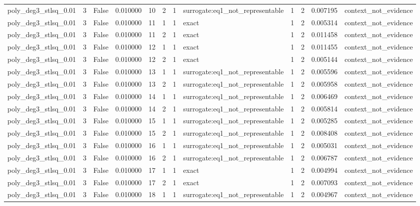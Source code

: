 \begin{tabular}{lrrrrrrlrrrl}
poly\_deg3\_stlsq\_0.01 & 3 & False & 0.010000 & 10 & 2 & 1 & surrogate:eq1\_not\_representable & 1 & 2 & 0.007195 & context\_not\_evidence \\
poly\_deg3\_stlsq\_0.01 & 3 & False & 0.010000 & 11 & 1 & 1 & exact & 1 & 2 & 0.005314 & context\_not\_evidence \\
poly\_deg3\_stlsq\_0.01 & 3 & False & 0.010000 & 11 & 2 & 1 & exact & 1 & 2 & 0.011458 & context\_not\_evidence \\
poly\_deg3\_stlsq\_0.01 & 3 & False & 0.010000 & 12 & 1 & 1 & exact & 1 & 2 & 0.011455 & context\_not\_evidence \\
poly\_deg3\_stlsq\_0.01 & 3 & False & 0.010000 & 12 & 2 & 1 & exact & 1 & 2 & 0.005144 & context\_not\_evidence \\
poly\_deg3\_stlsq\_0.01 & 3 & False & 0.010000 & 13 & 1 & 1 & surrogate:eq1\_not\_representable & 1 & 2 & 0.005596 & context\_not\_evidence \\
poly\_deg3\_stlsq\_0.01 & 3 & False & 0.010000 & 13 & 2 & 1 & surrogate:eq1\_not\_representable & 1 & 2 & 0.005958 & context\_not\_evidence \\
poly\_deg3\_stlsq\_0.01 & 3 & False & 0.010000 & 14 & 1 & 1 & surrogate:eq1\_not\_representable & 1 & 2 & 0.006469 & context\_not\_evidence \\
poly\_deg3\_stlsq\_0.01 & 3 & False & 0.010000 & 14 & 2 & 1 & surrogate:eq1\_not\_representable & 1 & 2 & 0.005814 & context\_not\_evidence \\
poly\_deg3\_stlsq\_0.01 & 3 & False & 0.010000 & 15 & 1 & 1 & surrogate:eq1\_not\_representable & 1 & 2 & 0.005285 & context\_not\_evidence \\
poly\_deg3\_stlsq\_0.01 & 3 & False & 0.010000 & 15 & 2 & 1 & surrogate:eq1\_not\_representable & 1 & 2 & 0.008408 & context\_not\_evidence \\
poly\_deg3\_stlsq\_0.01 & 3 & False & 0.010000 & 16 & 1 & 1 & surrogate:eq1\_not\_representable & 1 & 2 & 0.005031 & context\_not\_evidence \\
poly\_deg3\_stlsq\_0.01 & 3 & False & 0.010000 & 16 & 2 & 1 & surrogate:eq1\_not\_representable & 1 & 2 & 0.006787 & context\_not\_evidence \\
poly\_deg3\_stlsq\_0.01 & 3 & False & 0.010000 & 17 & 1 & 1 & exact & 1 & 2 & 0.004994 & context\_not\_evidence \\
poly\_deg3\_stlsq\_0.01 & 3 & False & 0.010000 & 17 & 2 & 1 & exact & 1 & 2 & 0.007093 & context\_not\_evidence \\
poly\_deg3\_stlsq\_0.01 & 3 & False & 0.010000 & 18 & 1 & 1 & surrogate:eq1\_not\_representable & 1 & 2 & 0.004967 & context\_not\_evidence \\

\end{tabular}
